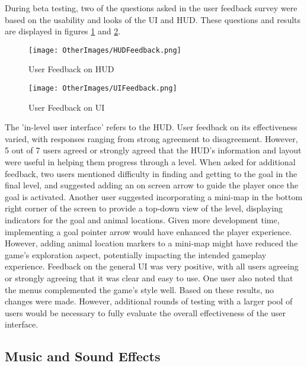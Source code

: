\documentclass[10pt]{final_report}
\begin{document}
During beta testing, two of the questions asked in the user feedback survey were based on the usability and looks of the UI and HUD. These questions and results are displayed in figures \ref{fig:label_HUDFeedback} and \ref{fig:label_UIFeedback}.
\begin{figure}[H]
    \centering
    \texttt{[image: OtherImages/HUDFeedback.png]}
    \caption{User Feedback on HUD}
    \label{fig:label_HUDFeedback}
\end{figure}
\begin{figure}[H]
    \centering
    \texttt{[image: OtherImages/UIFeedback.png]}
    \caption{User Feedback on UI}
    \label{fig:label_UIFeedback}
\end{figure}
The 'in-level user interface' refers to the HUD. User feedback on its effectiveness varied, with responses ranging from strong agreement to disagreement. However, 5 out of 7 users agreed or strongly agreed that the HUD's information and layout were useful in helping them progress through a level.
When asked for additional feedback, two users mentioned difficulty in finding and getting to the goal in the final level, and suggested adding an on screen arrow to guide the player once the goal is activated. Another user suggested incorporating a mini-map in the bottom right corner of the screen to provide a top-down view of the level, displaying indicators for the goal and animal locations.
Given more development time, implementing a goal pointer arrow would have enhanced the player experience. However, adding animal location markers to a mini-map might have reduced the game's exploration aspect, potentially impacting the intended gameplay experience.
\newline
Feedback on the general UI was very positive, with all users agreeing or strongly agreeing that it was clear and easy to use. One user also noted that the menus complemented the game's style well. Based on these results, no changes were made. However, additional rounds of testing with a larger pool of users would be necessary to fully evaluate the overall effectiveness of the user interface.

\subsection{Music and Sound Effects}
\end{document}
